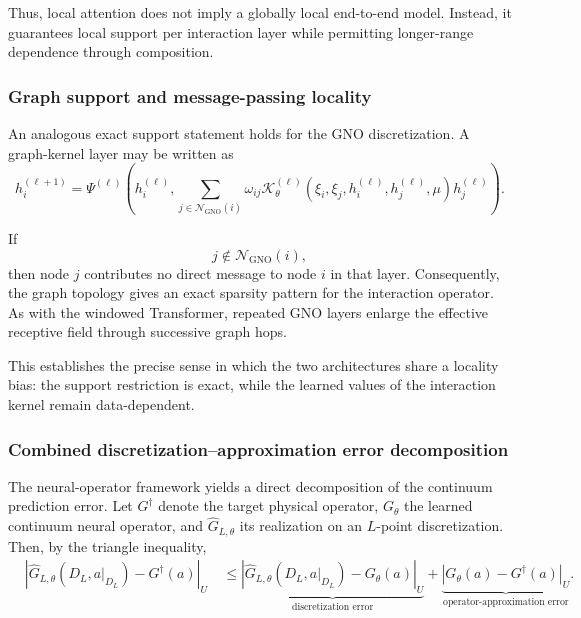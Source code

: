 \documentclass[11pt,a4paper]{article}
\begin{document}
\begin{sloppypar}
Thus, local attention does not imply a globally local end-to-end model. Instead, it guarantees local support per interaction layer while permitting longer-range dependence through composition.

\subsubsection{Graph support and message-passing locality}

An analogous exact support statement holds for the GNO discretization. A graph-kernel layer may be written as
\begin{equation}
h_i^{(\ell+1)}
=
\Psi^{(\ell)}
\left(
h_i^{(\ell)},
\sum_{
j\in\mathcal{N}_{\mathrm{GNO}}(i)
}
\omega_{ij}
\mathcal{K}_{\theta}^{(\ell)}
\left(
\xi_i,
\xi_j,
h_i^{(\ell)},
h_j^{(\ell)},
\mu
\right)
h_j^{(\ell)}
\right).
\label{eq:gno-local-message-passing-guarantee}
\end{equation}

If
\begin{equation}
j
\notin
\mathcal{N}_{\mathrm{GNO}}(i),
\end{equation}
then node $j$ contributes no direct message to node $i$ in that layer. Consequently, the graph topology gives an exact sparsity pattern for the interaction operator. As with the windowed Transformer, repeated GNO layers enlarge the effective receptive field through successive graph hops.

This establishes the precise sense in which the two architectures share a locality bias: the support restriction is exact, while the learned values of the interaction kernel remain data-dependent.

\subsubsection{Combined discretization--approximation error decomposition}

The neural-operator framework yields a direct decomposition of the continuum prediction error. Let $G^\dagger$ denote the target physical operator, $G_\theta$ the learned continuum neural operator, and $\widehat{G}_{L,\theta}$ its realization on an $L$-point discretization. Then, by the triangle inequality,
\begin{align}
&
\left|
\widehat{G}_{L,\theta}
\left(
D_L,
a|_{D_L}
\right)
-
G^\dagger(a)
\right|_U
\nonumber
\
&
\le
\underbrace{
\left|
\widehat{G}_{L,\theta}
\left(
D_L,
a|_{D_L}
\right)
-
G_\theta(a)
\right|_U
}_{
\text{discretization error}
}
+
\underbrace{
\left|
G_\theta(a)
-
G^\dagger(a)
\right|_U
}_{
\text{operator-approximation error}
}.
\label{eq:error-decomposition}
\end{align}


\end{sloppypar}
\end{document}
